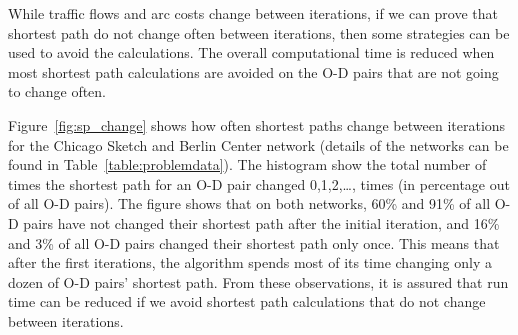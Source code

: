 While traffic flows and arc costs change between iterations,
if we can prove that shortest path do not change often between iterations,
then some strategies can be used to avoid the calculations.
The overall computational time is reduced when most shortest path calculations are avoided on the O-D pairs that are not going to change often.

Figure~\ref{fig:sp_change} shows how often shortest paths change between iterations for the Chicago Sketch and Berlin Center network (details of the networks can be found in Table~\ref{table:problemdata}).
The histogram show the total number of times the shortest path for an O-D pair changed 0,1,2,\ldots, times (in percentage out of all O-D pairs).
The figure shows that on both networks, 60\% and 91\% of all O-D pairs have not changed their shortest path after the initial iteration,
and 16\% and 3\% of all O-D pairs changed their shortest path only once.
This means that after the first iterations,
the algorithm spends most of its time changing only a dozen of O-D pairs' shortest path.
From these observations,
it is assured that run time can be reduced if we avoid shortest path calculations that do not change between iterations.

